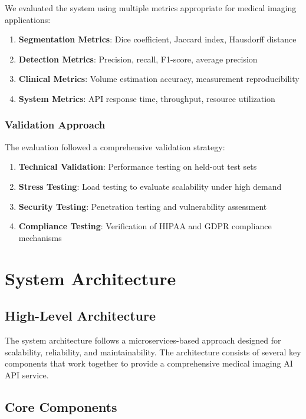 \documentclass[12pt,a4paper]{article}
\begin{document}
We evaluated the system using multiple metrics appropriate for medical imaging applications:

\begin{enumerate}
    \item \textbf{Segmentation Metrics}: Dice coefficient, Jaccard index, Hausdorff distance
    \item \textbf{Detection Metrics}: Precision, recall, F1-score, average precision
    \item \textbf{Clinical Metrics}: Volume estimation accuracy, measurement reproducibility
    \item \textbf{System Metrics}: API response time, throughput, resource utilization
\end{enumerate}

\subsubsection{Validation Approach}

The evaluation followed a comprehensive validation strategy:

\begin{enumerate}
    \item \textbf{Technical Validation}: Performance testing on held-out test sets
    \item \textbf{Stress Testing}: Load testing to evaluate scalability under high demand
    \item \textbf{Security Testing}: Penetration testing and vulnerability assessment
    \item \textbf{Compliance Testing}: Verification of HIPAA and GDPR compliance mechanisms
\end{enumerate}

\section{System Architecture}

\subsection{High-Level Architecture}

The system architecture follows a microservices-based approach designed for scalability, reliability, and maintainability. The architecture consists of several key components that work together to provide a comprehensive medical imaging AI API service.

\subsection{Core Components}
\end{document}
